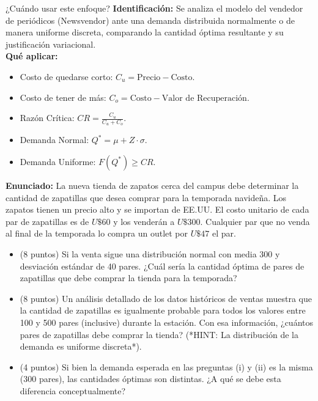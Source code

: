 \documentclass[11pt, a4paper]{article}
\begin{document}
  \begin{tipprueba}{¿Cuándo usar este enfoque?}
    \textbf{Identificación:} Se analiza el modelo del vendedor de periódicos (Newsvendor) ante una demanda distribuida normalmente o de manera uniforme discreta, comparando la cantidad óptima resultante y su justificación variacional.\\
    \textbf{Qué aplicar:}
    \begin{itemize}
      \item Costo de quedarse corto: $C_u = \text{Precio} - \text{Costo}$.
      \item Costo de tener de más: $C_o = \text{Costo} - \text{Valor de Recuperación}$.
      \item Razón Crítica: $CR = \frac{C_u}{C_u + C_o}$.
      \item Demanda Normal: $Q^* = \mu + Z \cdot \sigma$.
      \item Demanda Uniforme: $F(Q^*) \ge CR$.
    \end{itemize}
  \end{tipprueba}

  \textbf{Enunciado:}
  La nueva tienda de zapatos cerca del campus debe determinar la cantidad de zapatillas que desea comprar para la temporada navideña. Los zapatos tienen un precio alto y se importan de EE.UU. El costo unitario de cada par de zapatillas es de $U\$60$ y los venderán a $U\$300$. Cualquier par que no venda al final de la temporada lo compra un outlet por $U\$47$ el par.

  \begin{itemize}
    \item[\textbf{i.}] (8 puntos) Si la venta sigue una distribución normal con media 300 y desviación estándar de 40 pares. ¿Cuál sería la cantidad óptima de pares de zapatillas que debe comprar la tienda para la temporada?
    \item[\textbf{ii.}] (8 puntos) Un análisis detallado de los datos históricos de ventas muestra que la cantidad de zapatillas es igualmente probable para todos los valores entre 100 y 500 pares (inclusive) durante la estación. Con esa información, ¿cuántos pares de zapatillas debe comprar la tienda? (*HINT: La distribución de la demanda es uniforme discreta*).
    \item[\textbf{iii.}] (4 puntos) Si bien la demanda esperada en las preguntas (i) y (ii) es la misma ($300$ pares), las cantidades óptimas son distintas. ¿A qué se debe esta diferencia conceptualmente?
  \end{itemize}
\end{document}
